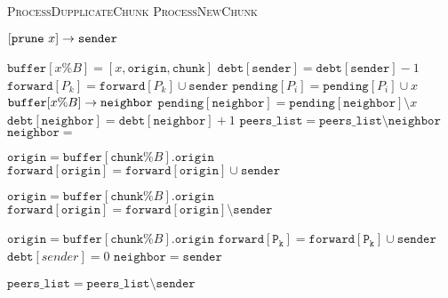 \documentclass{article}
\begin{document}
\begin{algorithmic}
  \State \textsc{ProcessDupplicateChunk}
  \Else
  \State \textsc{ProcessNewChunk}
  \EndIf
  \EndProcedure  
\end{algorithmic}

\begin{algorithmic}
  \State $[\mathtt{prune}~x] \rightarrow \mathtt{sender}$
  \EndProcedure  
\end{algorithmic}

\begin{algorithmic}
  \State $\mathtt{buffer}[x \% B] = [x,\mathtt{origin},\mathtt{chunk}]$
  \State $\mathtt{debt}[\mathtt{sender}] = \mathtt{debt}[\mathtt{sender}]-1$
  \State $\mathtt{forward}[P_k] = \mathtt{forward}[P_k] \cup \mathtt{sender}$
  \EndIf
  \State $\mathtt{pending}[P_i] = \mathtt{pending}[P_i] \cup x$
  \EndFor
  \State $\mathtt{buffer}[x\% B] \rightarrow \mathtt{neighbor}$
  \State $\mathtt{pending}[\mathtt{neighbor}] = \mathtt{pending}[\mathtt{neighbor}] \setminus x$
  \State $\mathtt{debt}[\mathtt{neighbor}]=\mathtt{debt}[\mathtt{neighbor}]+1$
  \State $\mathtt{peers\_list} = \mathtt{peers\_list}\setminus \mathtt{neighbor}$
  \EndFor
  \EndIf
  \EndFor
  \State $\mathtt{neighbor} =$ 
  \EndProcedure  
\end{algorithmic}

\begin{algorithmic}

  \State $\mathtt{origin}=\mathtt{buffer}[\mathtt{chunk}\% B].\mathtt{origin}$
  \State $\mathtt{forward}[\mathtt{origin}] = \mathtt{forward}[\mathtt{origin}] \cup \mathtt{sender}$
  \EndIf

  \State $\mathtt{origin}=\mathtt{buffer}[\mathtt{chunk}\% B].\mathtt{origin}$
  \State$\mathtt{forward}[\mathtt{origin}] = \mathtt{forward}[\mathtt{origin}] \setminus \mathtt{sender}$
  \EndIf
  
  \State $\mathtt{origin}=\mathtt{buffer}[\mathtt{chunk}\% B].\mathtt{origin}$
  \State $\mathtt{forward}[\mathtt{P_k}] = \mathtt{forward}[\mathtt{P_ k}] \cup \mathtt{sender}$
  \State $\mathtt{debt}[sender] = 0$
  \State $\mathtt{neighbor} = \mathtt{sender}$
  \EndIf
  
  \State $\mathtt{peers\_list} = \mathtt{peers\_list}\setminus \mathtt{sender}$
  \EndFor
  \EndIf
  
  \EndProcedure  
\end{algorithmic}
\end{document}
